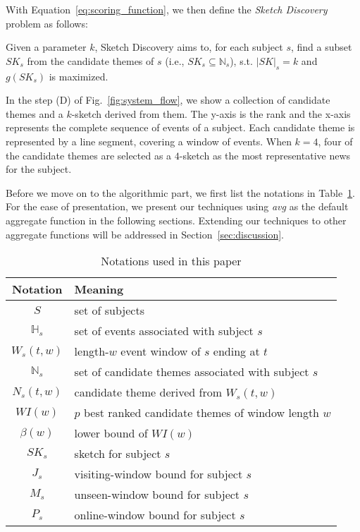 With Equation~\ref{eq:scoring_function}, we then define the \emph{Sketch Discovery} problem as follows:

\begin{definition} 
Given a parameter $k$, Sketch Discovery aims to, for each subject $s$, 
find a subset $SK_s$ from the candidate themes of $s$ (i.e., $SK_s \subseteq \mathbb{N}_s$), s.t. $|SK|_s = k$ and $g(SK_s)$ is maximized.
\end{definition}

\begin{example}  
In the step (D) of Fig.~\ref{fig:system_flow}, we show a collection of candidate themes and a $k$-sketch derived from them. The y-axis is the rank and the x-axis represents the complete sequence of events of a subject. Each candidate theme is represented by a line segment, covering a window of events. When $k=4$, four of the candidate themes are selected as a $4$-sketch as the most representative news for the subject.	
\end{example}

Before we move on to the algorithmic part, we first list the notations in Table~\ref{tbl:notations}. For the 
ease of presentation, we present our techniques using \emph{avg} as the default aggregate function in the following sections. Extending our techniques to other aggregate functions will be addressed in Section~\ref{sec:discussion}.

\begin{table}[h]
\centering
\begin{tabular}{|c|l|}
\hline 
\textbf{Notation} & \textbf{Meaning} \\ 
\hline
$S$ & set of subjects \\
\hline
$\mathbb{H}_s$ & set of events associated with subject $s$\\
\hline
$W_s(t,w)$ & length-$w$ event window of $s$ ending at $t$\\
\hline
$\mathbb{N}_s$ & set of candidate themes associated with subject $s$\\
\hline 
$N_s(t, w)$ & candidate theme derived from $W_s(t,w)$ \\ 
\hline 
$WI(w)$ & $p$ best ranked candidate themes of window length $w$\\
\hline
$\beta(w)$ & lower bound of $WI(w)$\\
\hline
$SK_s$ & sketch for subject $s$ \\
\hline
$J_s$ & visiting-window bound for subject $s$ \\
\hline
$M_s$ & unseen-window bound for subject $s$\\
\hline
$P_s$ & online-window bound for subject $s$\\
\hline
\end{tabular} 
\caption{Notations used in this paper}
\label{tbl:notations}
\end{table}
